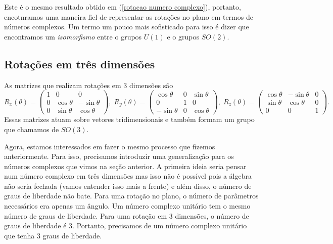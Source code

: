 \documentclass{article}
\numberwithin{equation}{section}
\numberwithin{figure}{section}
\begin{document}
Este é o mesmo resultado obtido em (\ref{rotacao numero complexo}), portanto, encotnramos uma maneira fiel de representar as rotações no plano em termos de números complexos. Um termo um pouco mais sofisticado para isso é dizer que encontramos um \textit{isomorfismo} entre o grupos $U(1)$ e o grupos $SO(2)$. 
\subsection{Rotações em três dimensões}
As matrizes que realizam rotações em 3 dimensões são 
\begin{equation}
	R_x(\theta)=\begin{pmatrix}
		1 & 0 & 0 \\
		0 & \cos\theta & -\sin\theta \\
		0 & \sin\theta & \cos\theta
	\end{pmatrix},\;R_y(\theta)=\begin{pmatrix}
	\cos\theta & 0 & \sin\theta \\
	0 & 1 & 0 \\
	-\sin\theta & 0 & \cos\theta
	\end{pmatrix},\; R_z(\theta)=\begin{pmatrix}
	\cos\theta & -\sin\theta & 0 \\
	\sin\theta & \cos\theta & 0 \\
	0 & 0 & 1
	\end{pmatrix}.
\end{equation}
Essas matrizes atuam sobre vetores tridimensionais e também formam um grupo que chamamos de $SO(3)$. 

Agora, estamos interessados em fazer o mesmo processo que fizemos anteriormente. Para isso, precisamos introduzir uma generalização para os números complexos que vimos na seção anterior. A primeira ideia seria pensar num número complexo em três dimensões mas isso não é possível pois a álgebra não seria fechada (vamos entender isso mais a frente) e além disso, o número de graus de liberdade não bate. Para uma rotação no plano, o número de parâmetros necessários era apenas um ângulo. Um número complexo unitário tem o mesmo número de graus de liberdade. Para uma rotação em 3 dimensões, o número de graus de liberdade é 3. Portanto, precisamos de um número complexo unitário que tenha 3 graus de liberdade. 
\end{document}
